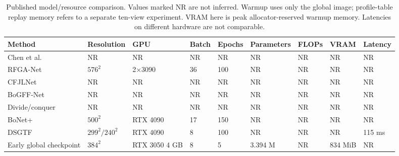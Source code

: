 \begin{table}[!t]
\centering\footnotesize
\caption{Published model/resource comparison. Values marked NR are not inferred. Warmup uses only the global image; profile-table replay memory refers to a separate ten-view experiment. VRAM here is peak allocator-reserved warmup memory. Latencies on different hardware are not comparable.}
\label{tab:prelim_sota_resources}
\begin{tabularx}{\textwidth}{@{}p{28mm}XXXXXXXX@{}}
\toprule
Method & Resolution & GPU & Batch & Epochs & Parameters & FLOPs & VRAM & Latency \\
\midrule
Chen et al.~\cite{chen} & NR & NR & NR & NR & NR & NR & NR & NR \\
RFGA-Net~\cite{rfga} & $576^2$ & 2$\times$3090 & 36 & 100 & NR & NR & NR & NR \\
CFJLNet~\cite{cfjl} & NR & NR & NR & NR & NR & NR & NR & NR \\
BoGFF-Net~\cite{bogff} & NR & NR & NR & NR & NR & NR & NR & NR \\
Divide/conquer~\cite{lightweight} & NR & NR & NR & NR & NR & NR & NR & NR \\
BoNet+~\cite{bonetplus} & $500^2$ & RTX 4090 & 17 & 150 & NR & NR & NR & NR \\
DSGTF~\cite{stage} & $299^2/240^2$ & RTX 4090 & 8 & 100 & NR & NR & NR & 115 ms \\
Early global checkpoint & $384^2$ & RTX 3050 4 GB & 8 & 5 & 3.394 M & NR & 834 MiB & NR \\
\bottomrule
\end{tabularx}
\end{table}